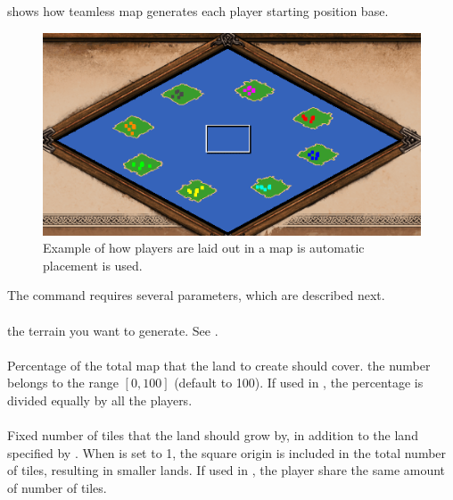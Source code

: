 \begin{appendices}
     shows how teamless map generates each player starting position base.

    \begin{figure}
        \centering
        \includegraphics[width=1.0\textwidth]{src/images/create-player-lands}
        \caption{Example of how players are laid out in a map is automatic placement is used.}
        \label{fig:create-player-lands}
    \end{figure}

    The command requires several parameters, which are described next.
    
    \paragraph{}
    the terrain you want to generate. See .

    \paragraph{}
    Percentage of the total map that the land to create should cover. the number belongs to the range $[0,100]$ (default to 100). If used in , the percentage is divided equally by all the players.

    \paragraph{}
    Fixed number of tiles that the land should grow by, in addition to the land specified by . When  is set to 1, the square origin is included in the total number of tiles, resulting in smaller lands. If used in , the player share the same amount of number of tiles.


\end{appendices}
